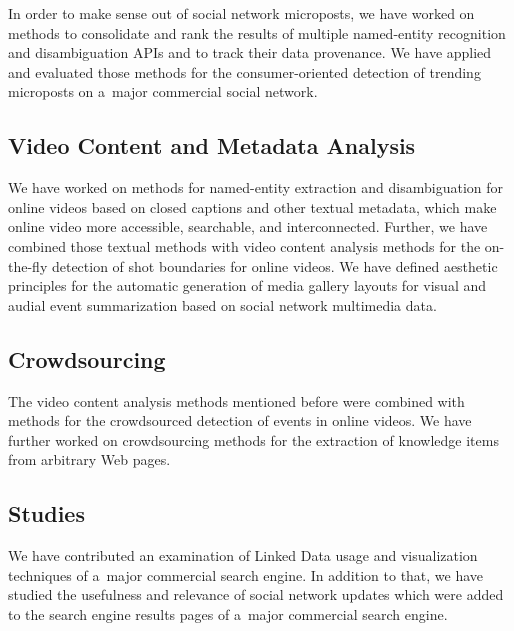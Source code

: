 In order to make sense out of social network microposts,
we have worked on methods to consolidate and rank
the results of multiple named-entity recognition and
disambiguation APIs and to track their data provenance.
We have applied and evaluated those methods
for the consumer-oriented detection of trending microposts
on a~major commercial social network.

\subsection{Video Content and Metadata Analysis}

We have worked on methods for named-entity extraction and
disambiguation for online videos based on closed captions
and other textual metadata, which make online video
more accessible, searchable, and interconnected.
Further, we have combined those textual methods with 
video content analysis methods for the on-the-fly detection
of shot boundaries for online videos.
We have defined aesthetic principles
for the automatic generation of media gallery layouts
for visual and audial event summarization
based on social network multimedia data.
        
\subsection{Crowdsourcing}

The video content analysis methods mentioned before
were combined with methods for the crowdsourced detection
of events in online videos.
We have further worked on crowdsourcing methods
for the extraction of knowledge items from arbitrary Web pages.

\subsection{Studies}

We have contributed an examination of Linked Data usage and
visualization techniques of a~major commercial search engine.
In addition to that, we have studied the usefulness and relevance
of social network updates which were added to the search engine
results pages of a~major commercial search engine.

